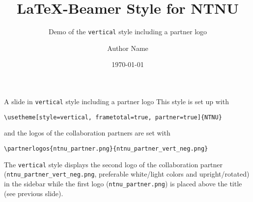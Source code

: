 \documentclass[aspectratio=169]{beamer}
\title{\LaTeX{}-Beamer Style for NTNU}
\subtitle{Demo of the  \texttt{vertical} style including a partner logo}
\author{Author Name}
\date{\today}
\begin{document}
	\maketitle
	\begin{frame}[fragile]{A slide in \texttt{vertical} style including a partner logo}
		This style is set up with

		\lstinline!\usetheme[style=vertical, frametotal=true, partner=true]{NTNU}!

		and the logos of the collaboration partners are set with

		\lstinline!\partnerlogos{ntnu_partner.png}{ntnu_partner_vert_neg.png}!

		The \texttt{vertical} style displays the second logo of the
		collaboration partner (\lstinline!ntnu_partner_vert_neg.png!,
		preferable white/light colors and upright/rotated) in the
		sidebar while the first logo (\lstinline!ntnu_partner.png!) is
		placed above the title (see previous slide).
	\end{frame}
\end{document}
